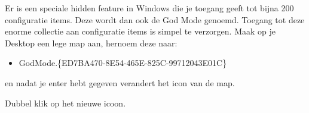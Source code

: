 Er is een speciale hidden feature in Windows die je toegang geeft tot bijna 200 configuratie items. Deze wordt dan ook de God Mode genoemd. Toegang tot deze enorme collectie aan configuratie items is simpel te verzorgen. Maak op je Desktop een lege map aan, hernoem deze naar:
\begin{itemize}
	\item GodMode.\{ED7BA470-8E54-465E-825C-99712043E01C\}
\end{itemize}
en nadat je enter hebt gegeven verandert het icon van de map.

\begin{minipage}[t]{\linewidth}
\raggedright
{}
\end{minipage}

Dubbel klik op het nieuwe icoon.

\begin{minipage}[t]{\linewidth}
\raggedright
{}
\end{minipage}
